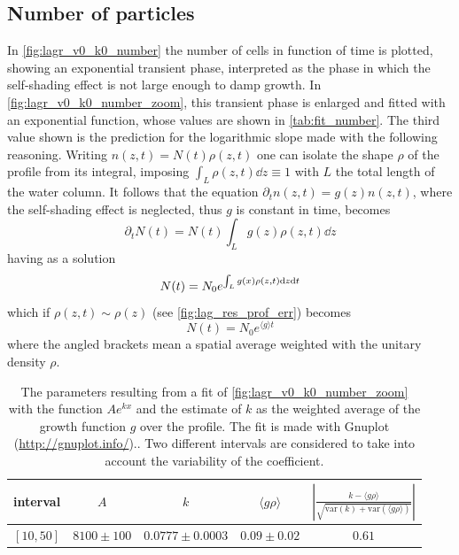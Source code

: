 



\subsection{Number of particles} \label{sec:lag_res_number}
In \autoref{fig:lagr_v0_k0_number} the number of cells in function of time is plotted, showing an exponential transient phase, interpreted as the phase in which the self-shading effect is not large enough to damp growth. In \autoref{fig:lagr_v0_k0_number_zoom}, this transient phase is enlarged and fitted with an exponential function, whose values are shown in \autoref{tab:fit_number}. The third value shown is the prediction for the logarithmic slope made with the following reasoning. Writing \( n(z,t) = N(t) \rho(z,t) \) one can isolate the shape $\rho$ of the profile from its integral, imposing \( \int_L \rho(z,t) \dd z \equiv 1 \) with $L$ the total length of the water column. It follows that the equation \( \partial_t n(z,t) = g(z) n(z,t) \), where the self-shading effect is neglected, thus $g$ is constant in time, becomes
\[ \partial_t N(t) = N(t) \int_L g(z) \rho(z,t) \dd z \]
having as a solution
\[ N(t) = N_0e^{ \int_L g(x) \rho(z,t) \mathrm{d} z \mathrm{d}t } \]
which if $\rho(z,t) \sim \rho(z)$ (see \autoref{fig:lag_res_prof_err}) becomes
\[ N(t) = N_0 e^{ \langle g\rangle t} \]
where the angled brackets mean a spatial average weighted with the unitary density $\rho$.

\begin{table}
    \centering
    \begin{tabular}{ c || c c | c || c}
        interval & $A$ & $k$  &  $\langle g \rho \rangle $ & $\left| \frac{k - \langle g \rho \rangle}{\sqrt{\mathrm{var}(k)+\mathrm{var}(\langle g \rho \rangle)}} \right|$ \\
        \hline 
        $[10,50]$ & $8100\pm100$ & $0.0777\pm0.0003$ & $0.09\pm0.02$ & $0.61$ \\
    \end{tabular}
    \caption{The parameters resulting from a fit of \autoref{fig:lagr_v0_k0_number_zoom} with the function $Ae^{kx}$ and the estimate of $k$ as the weighted average of the growth function $g$ over the profile. The fit is made with Gnuplot (\url{http://gnuplot.info/}).. Two different intervals are considered to take into account the variability of the coefficient.}
    \label{tab:fit_number}
\end{table}

